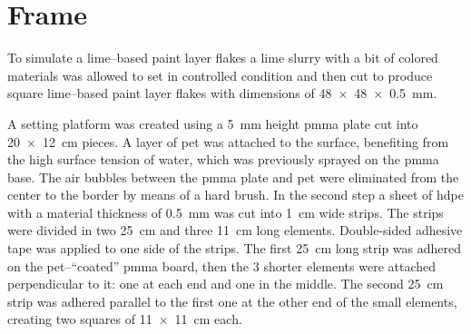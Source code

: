 \documentclass[review]{elsarticle}
\begin{document}
\section{Frame}

To simulate a lime--based paint layer flakes a lime slurry with a bit of colored materials was allowed to set in controlled condition and then cut to produce square lime--based paint layer flakes with dimensions of \SI[product-units = single]{48 x 48 x 0.5}{\mm}.

A setting platform was created using a \SI{5}{\mm} height \gls{pmma} plate cut into \SI[product-units = single]{20 x 12}{\cm} pieces.
A layer of \gls{pet} was attached to the surface, benefiting from the high surface tension of water, which was previously sprayed on the \gls{pmma} base.
The air bubbles between the \gls{pmma} plate and \gls{pet} were eliminated from the center to the border by means of a hard brush.
In the second step a sheet of \gls{hdpe} with a material thickness of \SI{0.5}{\mm} was cut into \SI{1}{\cm} wide strips. The strips were divided in two \SI{25}{\cm} and three \SI{11}{\cm} long elements.
Double-sided adhesive tape was applied to one side of the strips.
The first \SI{25}{\cm} long strip was adhered on the \gls{pet}--“coated” \gls{pmma} board, then the 3 shorter elements were attached perpendicular to it: one at each end and one in the middle.
The second \SI{25}{\cm} strip was adhered parallel to the first one at the other end of the small elements, creating two squares of \SI[product-units = single]{11 x 11}{\cm} each.
\end{document}
